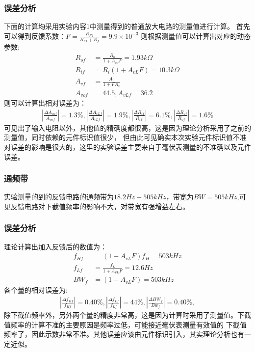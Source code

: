 \documentclass[a4paper,11pt,UTF8]{ctexart}
\begin{document}
  \subsubsection{误差分析}
  下面的计算均采用实验内容1中测量得到的普通放大电路的测量值进行计算。
  首先可以得到反馈系数：$F=\frac{R_{F1}}{R_{F1}+R_f}=9.9\times10^{-3}$
  则根据测量值可以计算出对应的动态参数:
  \begin{equation}
  \begin{aligned}
    R_{of}&=\frac{R_o}{1+A_{vo}F}=1.93k\Omega\\
    R_{if}&=R_i(1+A_{vL}F)=10.3k\Omega\\
    A_{vf}&=\frac{A_v}{1+FA_v}\\
    A_{vof}&=44.5,A_{vLf}=36.2
  \end{aligned}
  \end{equation}
  则可以计算出相对误差为：
  \begin{equation}
    \begin{aligned}
      \left |\frac{\Delta A_{vof}}{A_{vof}}\right |=1.3\%,
      \left |\frac{\Delta A_{vLf}}{A_{vLf}}\right |=1.9\%,
      \left |\frac{\Delta R_{if}}{R_{if}}\right |=6.1\%,
      \left |\frac{\Delta R_{of}}{R_{of}}\right |=1.6\%
    \end{aligned}
  \end{equation}
  可见出了输入电阻以外，其他值的精确度都很高，这是因为理论分析采用了之前的测量值，同时依赖的元件标识值很少，
  但由此可见确实本次实验元件标识值不准对误差的影响是很大的，这里的实验误差主要来自于毫伏表测量的不准确以及元件误差。
  \subsubsection{通频带}
  实验测量的到的反馈电路的通频带为$18.2Hz-505kHz$，带宽为$BW=505kHz$,可见反馈电路对下截值频率的影响不大，对带宽有强增益左右。
  \subsubsection{误差分析}
  理论计算出加入反馈后的数值为：
  \begin{equation}
  \begin{aligned}
    f_{Hf}&=(1+A_{vL}F)f_H=503kHz\\
    f_{Lf}&=\frac{f_L}{1+A_{vL}F}=12.6Hz\\
    BW_f&=(1+A_{vL}F)=503kHz
  \end{aligned}
  \end{equation}
  各个量的相对误差为:
  \begin{equation}
    \begin{aligned}
      \left |\frac{\Delta f_{Hf}}{f_{Hf}}\right |=0.40\%,
      \left |\frac{\Delta f_{Lf}}{f_{Lf}}\right |=44\%,
      \left |\frac{\Delta BW_{f}}{Bw_{f}}\right |=0.40\%,
    \end{aligned}
  \end{equation}
  除下截值频率外，另外两个量的精度非常高，这是因为计算时采用了测量值。下截值频率的计算不准的主要原因是频率过低，可能接近毫伏表测量有效值的
  下截值频率了，因此示数非常不准。其他误差应该由元件标识引入，其实理论分析也有一定近似。
\end{document}

